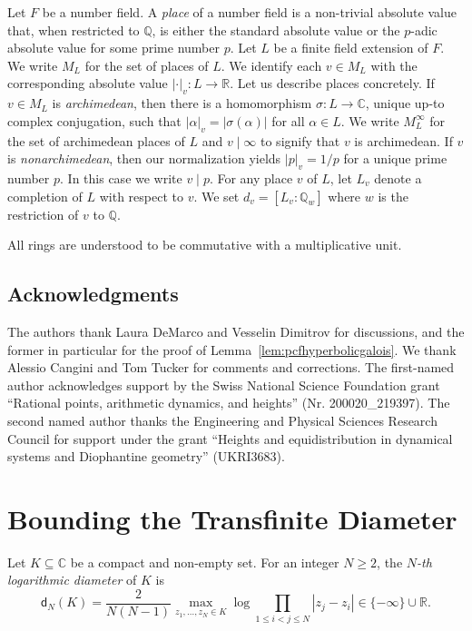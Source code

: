 \documentclass[12pt,oneside,a4]{amsart}
\newcommand{\IC}{\mathbb{C}}
\newcommand{\IQ}{\mathbb{Q}}
\newcommand{\IR}{\mathbb{R}}
\numberwithin{maincounter}{section}
\numberwithin{equation}{section}
\renewcommand{\subset}{\subseteq}
\begin{document}
Let $F$ be a number field. A \textit{place} of a number field is a
non-trivial absolute value that, when restricted to $\IQ$, is either
the standard absolute value or the $p$-adic absolute value for some
prime number $p$. Let $L$ be a finite field extension of $F$. We write
$M_L$ for the set of places of $L$. We identify each $v\in M_L$ with
the corresponding absolute value $|\cdot|_v\colon L\rightarrow\IR$.
Let us describe places concretely. If $v\in M_L$ is
\textit{archimedean}, then there is a homomorphism $\sigma\colon
L\rightarrow\IC$, unique up-to complex conjugation, such that
$|\alpha|_v = |\sigma(\alpha)|$ for all $\alpha\in L$. We write
$M_L^\infty$ for the set of archimedean places of $L$ and
$v\mid\infty$ to signify that $v$ is archimedean. If $v$ is
\textit{nonarchimedean}, then our normalization yields $|p|_v = 1/p$
for a unique prime number $p$. In this case we write $v\mid p$. For
any place $v$ of $L$, let $L_v$ denote a completion of $L$ with
respect to $v$. We set $d_v=[L_v:\IQ_w]$ where $w$ is the restriction
of $v$ to $\IQ$.


All rings are understood to be commutative with a multiplicative unit.

\subsection{Acknowledgments}
The authors thank Laura DeMarco and Vesselin Dimitrov
for discussions, and the former in particular for the
proof of Lemma~\ref{lem:pcfhyperbolicgalois}. We thank Alessio Cangini
and Tom Tucker
for comments and corrections.
The first-named author acknowledges
support by  the Swiss National Science Foundation grant ``Rational
points, arithmetic dynamics, and heights'' (Nr. 200020\_219397). The second named author thanks the Engineering and Physical Sciences Research Council for support
under the grant ``Heights and equidistribution in dynamical systems and Diophantine geometry'' (UKRI3683).  




\section{Bounding the Transfinite Diameter}
\label{sec:transfinitei}

Let $K\subset \IC$ be a compact and non-empty set. For an integer
$N\ge 2$, the \textit{$N$-th logarithmic diameter} of $K$ is
\begin{equation*}
  \mathsf{d}_N(K) = \frac{2}{N(N-1)} \max_{z_1,\ldots,z_N\in
    K}\log\prod_{1\le i<j\le N} |z_j-z_i| \in\{-\infty\}\cup\IR.
\end{equation*}
\end{document}
